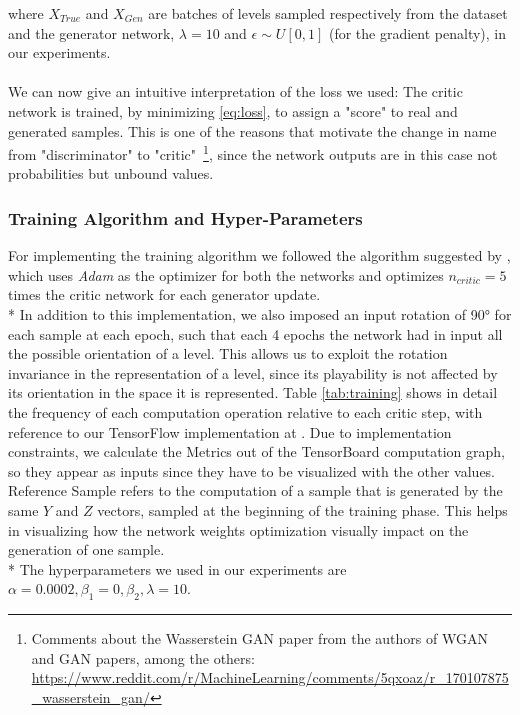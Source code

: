 where $X_{True}$ and $X_{Gen}$ are batches of levels sampled respectively from the dataset and the generator network, $\lambda = 10$ and $ \epsilon \sim U[0,1] $ (for the gradient penalty), in our experiments.

\paragraph{} We can now give an intuitive interpretation of the loss we used: The critic network is trained, by minimizing \ref{eq:loss}, to assign a "score" to real and generated samples. This is one of the reasons that motivate the change in name from "discriminator" to "critic"~\footnote{ Comments about the Wasserstein GAN paper from the authors of WGAN and GAN papers, among the others: \url{https://www.reddit.com/r/MachineLearning/comments/5qxoaz/r_170107875_wasserstein_gan/}}, since the network outputs are in this case not probabilities but unbound values.

\subsubsection{Training Algorithm and Hyper-Parameters}
For implementing the training algorithm we followed the algorithm suggested by \cite[alg.~1. p.~4]{wgangp}, which uses \textit{Adam}\cite{adam} as the optimizer for both the networks and optimizes $n_{critic} = 5$ times the critic network for each generator update. \\*
In addition to this implementation, we also imposed an input rotation of 90° for each sample at each epoch, such that each 4 epochs the network had in input all the possible orientation of a level. This allows us to exploit the rotation invariance in the representation of a level, since its playability is not affected by its orientation in the space it is represented. Table \ref{tab:training} shows in detail the frequency of each computation operation relative to each critic step, with reference to our TensorFlow implementation at \cite{gitrepo}. Due to implementation constraints, we calculate the Metrics out of the TensorBoard computation graph, so they appear as inputs since they have to be visualized with the other values. Reference Sample refers to the computation of a sample that is generated by the same $Y$ and $Z$ vectors, sampled at the beginning of the training phase. This helps in visualizing how the network weights optimization visually impact on the generation of one sample. \\*
The hyperparameters we used in our experiments are $\alpha=0.0002, \beta_1=0, \beta_2, \lambda=10$.

